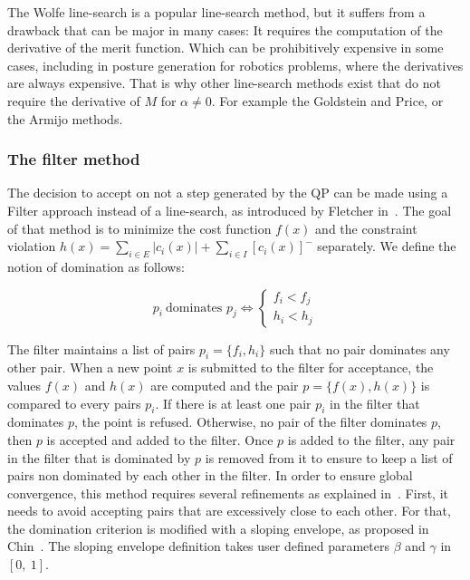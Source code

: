 The Wolfe line-search is a popular line-search method, but it suffers from a drawback that can be major in many cases: It requires the computation of the derivative of the merit function.
Which can be prohibitively expensive in some cases, including in posture generation for robotics problems, where the derivatives are always expensive.
That is why other line-search methods exist that do not require the derivative of $M$ for $\alpha\neq0$. For example the Goldstein and Price, or the Armijo methods.

\subsubsection{The filter method}
\label{ssub:the_filter_method}
The decision to accept on not a step generated by the QP can be made using a Filter approach instead of a line-search, as introduced by Fletcher in~\cite{fletcher:mathprog:2000}.
The goal of that method is to minimize the cost function $f(x)$ and the constraint violation $h(x) = \sum_{i\in E}{|c_i(x)|} + \sum_{i\in I}{{[c_i(x)]}^-}$ separately.
We define the notion of domination as follows:

\begin{definition}
  \begin{equation}
    p_i\ \text{dominates }p_j \Leftrightarrow \left\{
        \begin{array}{l}
    f_i < f_j \\
    h_i < h_j
  \end{array}  \right.
  \end{equation}
\end{definition}

The filter maintains a list of pairs $p_i=\{f_i, h_i\}$ such that no pair dominates any other pair.
When a new point $x$ is submitted to the filter for acceptance, the values $f(x)$ and $h(x)$ are computed and the pair $p = \{f(x), h(x)\}$ is compared to every pairs $p_i$.
If there is at least one pair $p_i$ in the filter that dominates $p$, the point is refused.
Otherwise, no pair of the filter dominates $p$, then $p$ is accepted and added to the filter.
Once $p$ is added to the filter, any pair in the filter that is dominated by $p$ is removed from it to ensure to keep a list of pairs non dominated by each other in the filter.
In order to ensure global convergence, this method requires several refinements as explained in~\cite{fletcher:mathprog:2000}.
First, it needs to avoid accepting pairs that are excessively close to each other. For that, the domination criterion is modified with a sloping envelope, as proposed in Chin~\cite{chin:mathprog:2003}.
The sloping envelope definition takes user defined parameters $\beta$ and $\gamma$ in $[0,\ 1]$.

